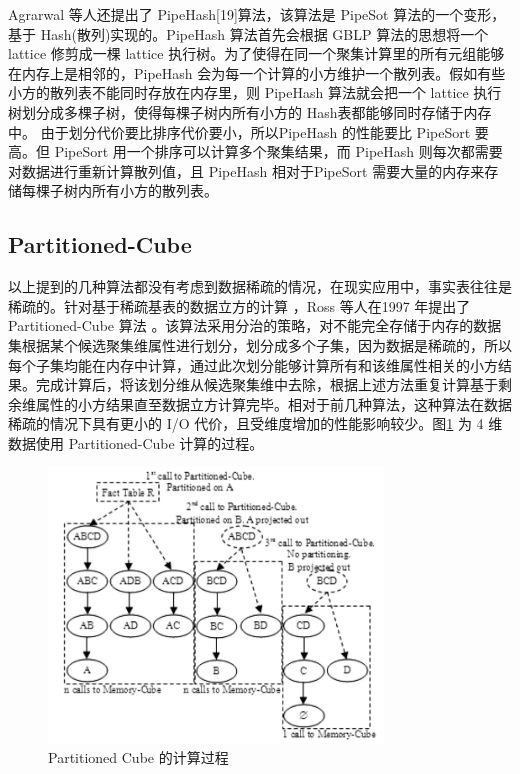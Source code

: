 Agrarwal 等人还提出了 PipeHash[19]算法，该算法是 PipeSot 算法的一个变形，基于 Hash(散列)实现的。PipeHash 算法首先会根据 GBLP 算法的思想将一个 lattice 修剪成一棵 lattice 执行树。为了使得在同一个聚集计算里的所有元组能够在内存上是相邻的，PipeHash 会为每一个计算的小方维护一个散列表。假如有些小方的散列表不能同时存放在内存里，则 PipeHash 算法就会把一个 lattice 执行树划分成多棵子树，使得每棵子树内所有小方的 Hash表都能够同时存储于内存中。 由于划分代价要比排序代价要小，所以PipeHash 的性能要比 PipeSort 要高。但 PipeSort 用一个排序可以计算多个聚集结果，而 PipeHash 则每次都需要对数据进行重新计算散列值，且 PipeHash 相对于PipeSort 需要大量的内存来存储每棵子树内所有小方的散列表。

\subsection{Partitioned-Cube}

以上提到的几种算法都没有考虑到数据稀疏的情况，在现实应用中，事实表往往是稀疏的。针对基于稀疏基表的数据立方的计算 ，Ross 等人在1997 年提出了 Partitioned-Cube 算法 \cite{ross1997fast}。该算法采用分治的策略，对不能完全存储于内存的数据集根据某个候选聚集维属性进行划分，划分成多个子集，因为数据是稀疏的，所以每个子集均能在内存中计算，通过此次划分能够计算所有和该维属性相关的小方结果。完成计算后，将该划分维从候选聚集维中去除，根据上述方法重复计算基于剩余维属性的小方结果直至数据立方计算完毕。相对于前几种算法，这种算法在数据稀疏的情况下具有更小的 I/O 代价，且受维度增加的性能影响较少。图\ref{partitioned_cube} 为 4 维数据使用 Partitioned-Cube 计算的过程。

\begin{figure}[!htb]
\centering\includegraphics[width=3.5in]{picture/ch_current_research/partitioned_cube} 
\caption{Partitioned Cube 的计算过程}\label{partitioned_cube} 
\end{figure} 

